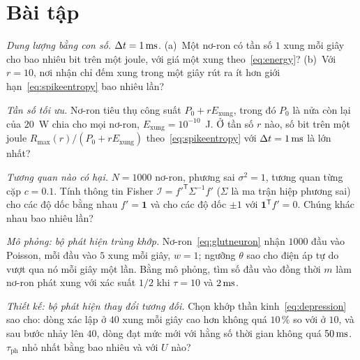 \section{Bài tập}

\begin{exercise}[\lvlA]
\label{ex:04:1}
\emph{Dung lượng bằng con số.} $\Delta t=1\,\text{ms}$. (a)~Một nơ-ron có tần số $1$ xung mỗi giây cho bao nhiêu bit trên một joule, với giá một xung theo~\eqref{eq:energy}? (b)~Với $r=10$, nơi nhận chỉ đếm xung trong một giây rút ra ít hơn giới hạn~\eqref{eq:spikeentropy} bao nhiêu lần?
\end{exercise}

\begin{exercise}[\lvlB]
\label{ex:04:2}
\emph{Tần số tối ưu.} Nơ-ron tiêu thụ công suất $P_0+rE_{\text{xung}}$, trong đó $P_0$ là nửa còn lại của $20$~W chia cho mọi nơ-ron, $E_{\text{xung}}=10^{-10}$~J. Ở tần số $r$ nào, số bit trên một joule $R_{\max}(r)/(P_0+rE_{\text{xung}})$ theo~\eqref{eq:spikeentropy} với $\Delta t=1\,\text{ms}$ là lớn nhất?
\end{exercise}

\begin{exercise}[\lvlB]
\label{ex:04:3}
\emph{Tương quan nào có hại.} $N=1000$ nơ-ron, phương sai $\sigma^2=1$, tương quan từng cặp $c=0.1$. Tính thông tin Fisher $\mathcal I=f'^{\mathsf T}\Sigma^{-1}f'$ ($\Sigma$ là ma trận hiệp phương sai) cho các độ dốc bằng nhau $f'=\mathbf 1$ và cho các độ dốc $\pm1$ với $\mathbf 1^{\mathsf T}f'=0$. Chúng khác nhau bao nhiêu lần?
\end{exercise}

\begin{exercise}[\lvlB]
\label{ex:04:4}
\emph{Mô phỏng: bộ phát hiện trùng khớp.} Nơ-ron~\eqref{eq:glutneuron} nhận $1000$ đầu vào Poisson, mỗi đầu vào $5$ xung mỗi giây, $w=1$; ngưỡng $\theta$ sao cho điện áp tự do vượt qua nó mỗi giây một lần. Bằng mô phỏng, tìm số đầu vào đồng thời $m$ làm nơ-ron phát xung với xác suất $1/2$ khi $\tau=10$ và $2\,\text{ms}$.
\end{exercise}

\begin{exercise}[\lvlB]
\label{ex:04:5}
\emph{Thiết kế: bộ phát hiện thay đổi tương đối.} Chọn khớp thần kinh~\eqref{eq:depression} sao cho: dòng xác lập ở $40$ xung mỗi giây cao hơn không quá $10\,\%$ so với ở $10$, và sau bước nhảy lên $40$, dòng đạt mức mới với hằng số thời gian không quá $50\,\text{ms}$. $\tau_{\text{ph}}$ nhỏ nhất bằng bao nhiêu và với $U$ nào?
\end{exercise}

